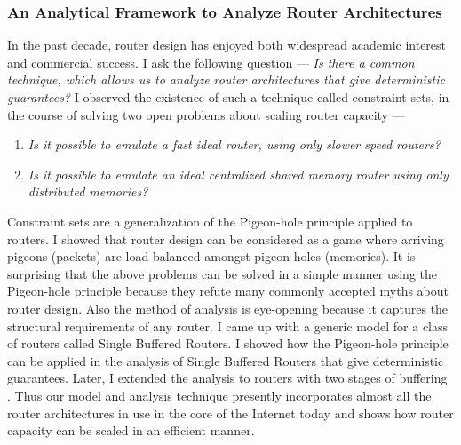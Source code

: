 \documentclass[11pt, a4paper]{article}
\begin{document}
\begin{small}

\subsubsection*{\small An Analytical Framework to Analyze Router Architectures}



In the past decade, router design has enjoyed both widespread academic interest and
commercial success. I ask the following question --- {\em Is there a common
technique, which allows us to analyze router architectures that give deterministic 
guarantees?}
I observed the existence of such a technique called constraint sets, in the course of solving 
two open problems about scaling router capacity ---

\begin{enumerate}

\item {\em Is it possible to emulate a fast ideal router, using only slower speed routers?}

\item {\em Is it possible to emulate an ideal centralized shared memory router using only distributed memories?}

\end{enumerate}


Constraint sets are a generalization of the Pigeon-hole principle applied to
routers. I showed that router design can be considered as a game where arriving
pigeons (packets) are load balanced amongst pigeon-holes (memories). 
It is surprising that the above problems can be solved \cite{pps, ppsmcast, dsm} in a simple
manner using the Pigeon-hole principle because they refute many commonly 
accepted myths about router design. 
Also the method of analysis is eye-opening because it captures the structural 
requirements of any router. 
I came up with a generic model for a class of routers called Single Buffered Routers. 
I showed how the Pigeon-hole principle can be applied in the analysis of Single Buffered
Routers that give deterministic guarantees.  Later, I extended the analysis to 
routers with two stages of buffering \cite{csets}. 
Thus our model and analysis technique
presently incorporates almost all the router architectures in use in the
core of the Internet today and shows how router capacity can be scaled in
an efficient manner.


\end{small}
\end{document}
